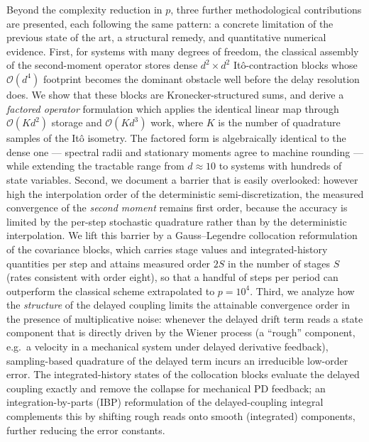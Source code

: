\documentclass[preprint,12pt]{elsarticle}
\begin{document}
Beyond the complexity reduction in $p$, three further methodological contributions are presented, each following the same pattern: a concrete limitation of the previous state of the art, a structural remedy, and quantitative numerical evidence. First, for systems with many degrees of freedom, the classical assembly of the second-moment operator stores dense $d^2 \times d^2$ It\^o-contraction blocks whose $\mathcal{O}(d^4)$ footprint becomes the dominant obstacle well before the delay resolution does. We show that these blocks are Kronecker-structured sums, and derive a \emph{factored operator} formulation which applies the identical linear map through $\mathcal{O}(K d^2)$ storage and $\mathcal{O}(K d^3)$ work, where $K$ is the number of quadrature samples of the It\^o isometry. The factored form is algebraically identical to the dense one --- spectral radii and stationary moments agree to machine rounding --- while extending the tractable range from $d \approx 10$ to systems with hundreds of state variables. Second, we document a barrier that is easily overlooked: however high the interpolation order of the deterministic semi-discretization, the measured convergence of the \emph{second moment} remains first order, because the accuracy is limited by the per-step stochastic quadrature rather than by the deterministic interpolation. We lift this barrier by a Gauss--Legendre collocation reformulation of the covariance blocks, which carries stage values and integrated-history quantities per step and attains measured order $2S$ in the number of stages $S$ (rates consistent with order eight), so that a handful of steps per period can outperform the classical scheme extrapolated to $p = 10^4$. Third, we analyze how the \emph{structure} of the delayed coupling limits the attainable convergence order in the presence of multiplicative noise: whenever the delayed drift term reads a state component that is directly driven by the Wiener process (a ``rough'' component, e.g.\ a velocity in a mechanical system under delayed derivative feedback), sampling-based quadrature of the delayed term incurs an irreducible low-order error. The integrated-history states of the collocation blocks evaluate the delayed coupling exactly and remove the collapse for mechanical PD feedback; an integration-by-parts (IBP) reformulation of the delayed-coupling integral complements this by shifting rough reads onto smooth (integrated) components, further reducing the error constants.
\end{document}
